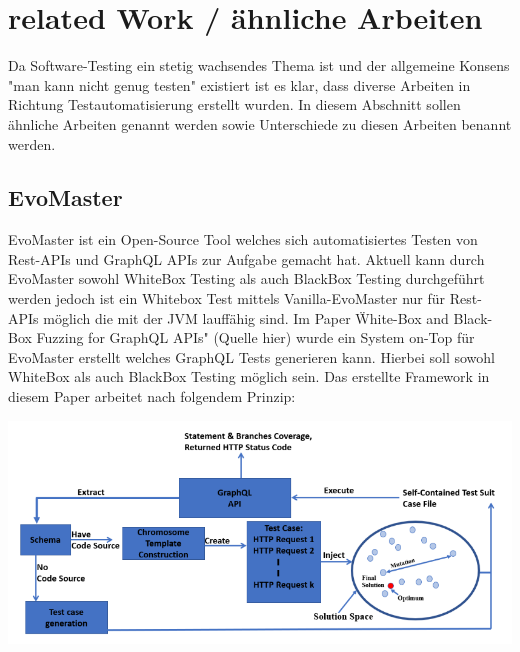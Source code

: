 \chapter{related Work / ähnliche Arbeiten}

Da Software-Testing ein stetig wachsendes Thema ist und der allgemeine Konsens "man kann nicht genug testen" existiert ist
es klar, dass diverse Arbeiten in Richtung Testautomatisierung erstellt wurden. In diesem Abschnitt sollen ähnliche Arbeiten
genannt werden sowie Unterschiede zu diesen Arbeiten benannt werden.

\section{EvoMaster}

EvoMaster ist ein Open-Source Tool welches sich automatisiertes Testen von Rest-APIs und GraphQL APIs zur Aufgabe gemacht hat.
Aktuell kann durch EvoMaster sowohl WhiteBox Testing als auch BlackBox Testing durchgeführt werden jedoch ist ein
Whitebox Test mittels Vanilla-EvoMaster nur für Rest-APIs möglich die mit der JVM lauffähig sind.
Im Paper \"White-Box and Black-Box Fuzzing for GraphQL APIs" (Quelle hier) wurde ein System on-Top für EvoMaster
erstellt welches GraphQL Tests generieren kann. Hierbei soll sowohl WhiteBox als auch BlackBox Testing möglich sein.
Das erstellte Framework in diesem Paper arbeitet nach folgendem Prinzip:

\begin{center}
    \includegraphics[width=\textwidth,height=\textheight,keepaspectratio]{content/hauptteil/related Work/evomaster_framework}
\end{center}

